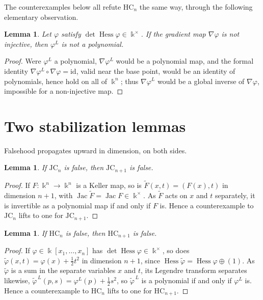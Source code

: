 \documentclass[11pt]{article}
\theoremstyle{plain}
\newtheorem{lemma}[theorem]{Lemma}
\theoremstyle{definition}
\newcommand{\kk}{\Bbbk}
\newcommand{\JC}{\mathrm{JC}}
\newcommand{\HC}{\mathrm{HC}}
\newcommand{\Hess}{\operatorname{Hess}}
\newcommand{\Jac}{\operatorname{Jac}}
\begin{document}
The counterexamples below all refute $\HC_n$ the same way, through the
following elementary observation.

\begin{lemma}\label{lem:noninj}
Let $\varphi$ satisfy $\det\Hess\varphi\in\kk^{\times}$. If the gradient
map $\nabla\varphi$ is not injective, then $\varphi^{L}$ is not a
polynomial.
\end{lemma}

\begin{proof}
Were $\varphi^{L}$ a polynomial, $\nabla\varphi^{L}$ would be a
polynomial map, and the formal identity
$\nabla\varphi^{L}\circ\nabla\varphi=\mathrm{id}$, valid near the base
point, would be an identity of polynomials, hence hold on all of
$\kk^{n}$; thus $\nabla\varphi^{L}$ would be a global inverse of
$\nabla\varphi$, impossible for a non-injective map.
\end{proof}

\section{Two stabilization lemmas}

Falsehood propagates upward in dimension, on both sides.

\begin{lemma}\label{lem:JCstab}
If $\JC_n$ is false, then $\JC_{n+1}$ is false.
\end{lemma}

\begin{proof}
If $F\colon\kk^n\to\kk^n$ is a Keller map, so is
$\widetilde F(x,t)=(F(x),t)$ in dimension $n+1$, with
$\Jac\widetilde F=\Jac F\in\kk^{\times}$. As $\widetilde F$ acts on $x$
and $t$ separately, it is invertible as a polynomial map if and only if
$F$ is. Hence a counterexample to $\JC_n$ lifts to one for $\JC_{n+1}$.
\end{proof}

\begin{lemma}\label{lem:HCstab}
If $\HC_n$ is false, then $\HC_{n+1}$ is false.
\end{lemma}

\begin{proof}
If $\varphi\in\kk[x_1,\dots,x_n]$ has $\det\Hess\varphi\in\kk^{\times}$,
so does $\widetilde\varphi(x,t)=\varphi(x)+\tfrac12 t^2$ in dimension
$n+1$, since $\Hess\widetilde\varphi=\Hess\varphi\oplus(1)$. As
$\widetilde\varphi$ is a sum in the separate variables $x$ and $t$, its
Legendre transform separates likewise,
$\widetilde\varphi^{\,L}(p,s)=\varphi^{L}(p)+\tfrac12 s^2$, so
$\widetilde\varphi^{\,L}$ is a polynomial if and only if $\varphi^{L}$
is. Hence a counterexample to $\HC_n$ lifts to one for $\HC_{n+1}$.
\end{proof}
\end{document}
